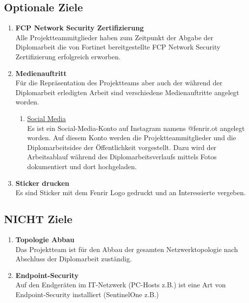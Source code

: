 \documentclass[
	headings=optiontotocandhead,%
	oneside,
	numbers=noenddot,%
	toc=flat, %
	10pt, %
	parskip=full, %
	listof=totoc, %
	listof=flat, %
	numbers=noenddot, %
	bibliography=totoc, %
	a4paper,DIV=14,
]{scrartcl}
\begin{document}
\subsection{Optionale Ziele}
\begin{enumerate}[start=1,label={\bfseries Ziel-O \arabic*},leftmargin=*,wide]
\item{\bfseries{FCP Network Security Zertifizierung}}\\
Alle Projektteammitglieder haben zum Zeitpunkt der Abgabe der Diplomarbeit die von Fortinet bereitgestellte FCP Network Security Zertifizierung erfolgreich erworben.

\item{\bfseries{Medienauftritt}}\\
Für die Repräsentation des Projektteams aber auch der während der Diplomarbeit erledigten Arbeit sind verschiedene Medienauftritte angelegt worden.

\begin{enumerate}[label=\alph*.]
\item{\underline{Social Media}}\\
Es ist ein Social-Media-Konto auf Instagram namens @fenrir.ot angelegt worden. Auf diesem Konto werden die Projektteammitglieder und die Diplomarbeitsidee der Öffentlichkeit vorgestellt. Dazu wird der Arbeitsablauf während des Diplomarbeitsverlaufs mittels Fotos dokumentiert und dort hochgeladen.

\end{enumerate}

\item{\bfseries{Sticker drucken}}\\
Es sind Sticker mit dem Fenrir Logo gedruckt und an Interessierte vergeben.
\end{enumerate}

\subsection{NICHT Ziele}
\begin{enumerate}[start=1,label={\bfseries Ziel-N \arabic*},leftmargin=*,wide]
\item{\bfseries{Topologie Abbau}}\\
Das Projektteam ist für den Abbau der gesamten Netzwerktopologie nach Abschluss der Diplomarbeit zuständig.
\item{\bfseries{Endpoint-Security}}\\
Auf den Endgeräten im IT-Netzwerk (PC-Hosts z.B.) ist eine Art von Endpoint-Security installiert (SentinelOne z.B.)
\end{enumerate}
\newpage
\end{document}
